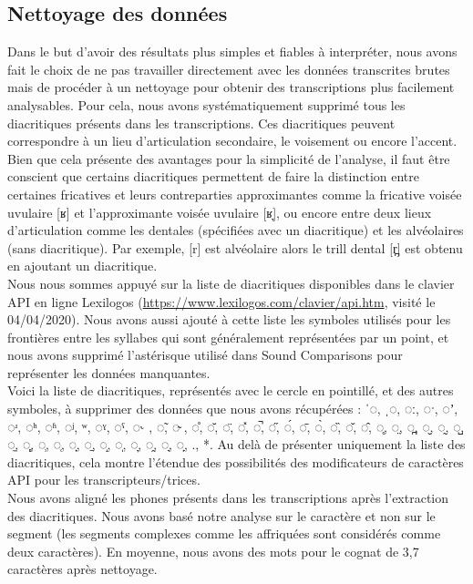 \subsection{Nettoyage des données}

Dans le but d'avoir des résultats plus simples et fiables à interpréter, nous avons fait le choix de ne pas travailler directement avec les données transcrites brutes mais de procéder à un nettoyage pour obtenir des transcriptions plus facilement analysables.
Pour cela, nous avons systématiquement supprimé tous les diacritiques présents dans les transcriptions. Ces diacritiques peuvent correspondre à un lieu d'articulation secondaire, le voisement ou encore l'accent. Bien que cela présente des avantages pour la simplicité de l'analyse, il faut être conscient que certains diacritiques permettent de faire la distinction entre certaines fricatives et leurs contreparties approximantes comme la fricative voisée uvulaire [ʁ] et l'approximante voisée uvulaire [ʁ̞], ou encore entre 
deux lieux d'articulation comme les dentales (spécifiées avec un diacritique) et les alvéolaires (sans diacritique). Par exemple, [r] est alvéolaire alors le trill dental [r̪] est obtenu en ajoutant un diacritique.\\ 

Nous nous sommes appuyé sur la liste de diacritiques disponibles dans le clavier API en ligne Lexilogos (\url{https://www.lexilogos.com/clavier/api.htm}, visité le 04/04/2020). Nous avons aussi ajouté à cette liste les symboles utilisés pour les frontières entre les syllabes qui sont généralement représentées par un point, et nous avons supprimé l'astérisque utilisé dans Sound Comparisons pour représenter les données manquantes.\\

Voici la liste de diacritiques, représentés avec le cercle en pointillé, et des autres symboles, à supprimer des données que nous avons récupérées :
{  ˈ◌, ˌ◌, ◌ː, ◌ˑ, ◌ʼ, ◌ʴ, ◌ʰ, ◌ʱ, ◌ʲ, ʷ, ◌ˠ, ◌ˤ, ◌˞ , ◌̃, ◌̴ , ◌̊, ◌̆, ◌̈, ◌̽, ◌̚, ◌̋, ◌́, ◌̄, ◌̀, ◌̏, ◌̌, ◌̂, ◌̥, ◌̤, ◌̪, ◌̬, ◌̰, ◌̺, ◌̼, ◌̻, ◌̹, ◌̜, ◌̟, ◌̠, ◌̝, ◌̩, ◌̞, ◌̯, ◌̘, ◌̙, ., *}. Au delà de présenter uniquement la liste des diacritiques, cela montre l'étendue des possibilités des modificateurs de caractères API pour les transcripteurs/trices.\\

Nous avons aligné les phones présents dans les transcriptions après l'extraction des diacritiques. Nous avons basé notre analyse sur le caractère et non sur le segment (les segments complexes comme les affriquées sont considérés comme deux caractères). En moyenne, nous avons des mots pour le cognat  de 3,7 caractères après nettoyage.

